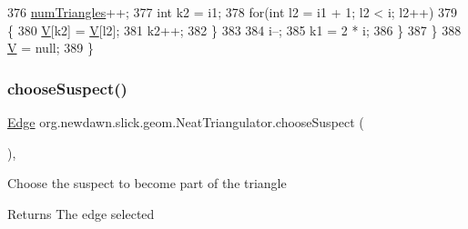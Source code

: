 \begin{DoxyCode}
376                 \mbox{\hyperlink{classorg_1_1newdawn_1_1slick_1_1geom_1_1_neat_triangulator_a5a9d015e9872ed5961cddfb49b3d1853}{numTriangles}}++;
377                 \textcolor{keywordtype}{int} k2 = i1;
378                 \textcolor{keywordflow}{for}(\textcolor{keywordtype}{int} l2 = i1 + 1; l2 < i; l2++)
379                 \{
380                     \mbox{\hyperlink{classorg_1_1newdawn_1_1slick_1_1geom_1_1_neat_triangulator_a149e043fb9cba67d89b3bcc8fb188df6}{V}}[k2] = \mbox{\hyperlink{classorg_1_1newdawn_1_1slick_1_1geom_1_1_neat_triangulator_a149e043fb9cba67d89b3bcc8fb188df6}{V}}[l2];
381                     k2++;
382                 \}
383 
384                 i--;
385                 k1 = 2 * i;
386             \}
387         \}
388         \mbox{\hyperlink{classorg_1_1newdawn_1_1slick_1_1geom_1_1_neat_triangulator_a149e043fb9cba67d89b3bcc8fb188df6}{V}} = null;
389     \}
\end{DoxyCode}
\mbox{\label{classorg_1_1newdawn_1_1slick_1_1geom_1_1_neat_triangulator_a0d36e6ed2cd14c353f7d3192cb403ed9}} 
\subsubsection{\texorpdfstring{choose\+Suspect()}{chooseSuspect()}}
{\footnotesize\ttfamily \mbox{\hyperlink{classorg_1_1newdawn_1_1slick_1_1geom_1_1_neat_triangulator_1_1_edge}{Edge}} org.\+newdawn.\+slick.\+geom.\+Neat\+Triangulator.\+choose\+Suspect (\begin{DoxyParamCaption}{ }\end{DoxyParamCaption})\hspace{0.3cm}{\ttfamily [inline]}, {\ttfamily [private]}}

Choose the suspect to become part of the triangle

\begin{DoxyReturn}{Returns}
The edge selected 
\end{DoxyReturn}

